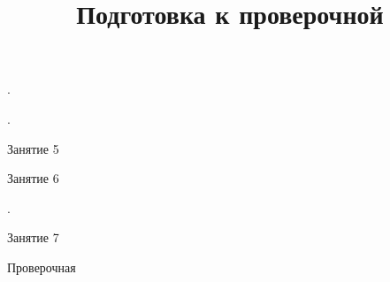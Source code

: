 \begin{class}[number=4]
	\begin{listofex}
		\item .
	\end{listofex}
\end{class}

\begin{homework}[number=2]
	\begin{listofex}
		\item .
	\end{listofex}
\end{homework}

\begin{class}[number=5]
	\begin{listofex}
		\item Занятие 5
	\end{listofex}
\end{class}

\begin{class}[number=6]
	\begin{listofex}
		\item Занятие 6
	\end{listofex}
\end{class}

\begin{homework}[number=4]
	\begin{listofex}
		\item .
	\end{listofex}
\end{homework}

\begin{class}[number=7]
	\title{Подготовка к проверочной}
	\begin{listofex}
		\item Занятие 7
	\end{listofex}
\end{class}

\begin{exam}
	\begin{listofex}
		\item Проверочная
	\end{listofex}
\end{exam}
